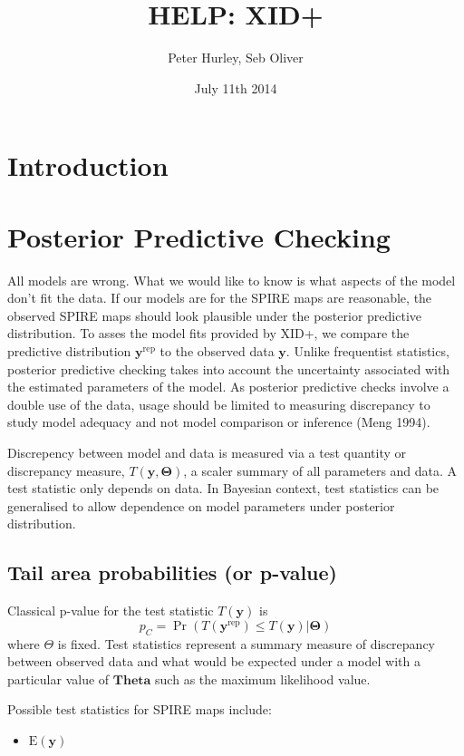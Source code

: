 \documentclass[a4paper,11pt]{article}
\author{Peter Hurley, Seb Oliver}
\title{HELP: XID+}
\date{July 11th 2014}
\begin{document}
\maketitle

\tableofcontents


\section{Introduction}
\section{Posterior Predictive Checking}
All models are wrong. What we would like to know is what aspects of the model don't fit the data. If our models are  for the SPIRE maps are reasonable, the observed SPIRE maps should look plausible under the posterior predictive distribution. To asses the model fits provided by XID+, we compare the predictive distribution $\mathbf{y}^{\mathrm{rep}}$ to the observed data $\mathbf{y}$. Unlike frequentist statistics, posterior predictive checking takes into account the uncertainty associated with the estimated parameters of the model. As posterior predictive checks involve a double use of the data, usage should be limited to measuring discrepancy to study model adequacy and not model comparison or inference (Meng 1994).

Discrepency between model and data is measured via a test quantity or discrepancy measure, $T(\mathbf{y},\mathbf{\Theta})$,  a scaler summary of all parameters and data. A test statistic  only depends on data. In Bayesian context, test statistics can be generalised to allow dependence on model parameters under posterior distribution.

\subsection{Tail area probabilities (or p-value)} 
Classical p-value for the test statistic $T(\mathbf{y})$ is
\begin{equation}
p_{C} = \Pr(T(\mathbf{y}^{\mathrm{rep}})\le T(\mathbf{y})|\mathbf{\Theta})
\end{equation}
where $\Theta$ is fixed. Test statistics represent a summary measure of discrepancy between observed data and what would be expected under a model with a particular value of $\mathbf{Theta}$ such as the maximum likelihood value. 

Possible test statistics for SPIRE maps include:
\begin{itemize}
\item $\mathrm{E}(\mathbf{y})$
\end{itemize}
\end{document}
